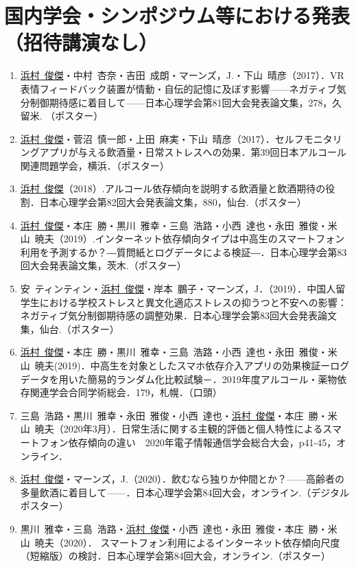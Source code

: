 \documentclass[11pt,a4paper]{article}
\begin{document}
\section{国内学会・シンポジウム等における発表（招待講演なし）}
\begin{enumerate}
	\item \underline{浜村\ 俊傑}・中村\ 杏奈・吉田\ 成朗・マーンズ，J.・下山\ 晴彦（2017）．VR表情フィードバック装置が情動・自伝的記憶に及ぼす影響——ネガティブ気分制御期待感に着目して——日本心理学会第81回大会発表論文集，278，久留米. （ポスター）
	\item \underline{浜村\ 俊傑}・菅沼\ 慎一郎・上田\ 麻実・下山\ 晴彦（2017）．セルフモニタリングアプリが与える飲酒量・日常ストレスへの効果．第39回日本アルコール関連問題学会，横浜．（ポスター）
	\item \underline{浜村\ 俊傑}（2018）.アルコール依存傾向を説明する飲酒量と飲酒期待の役割．日本心理学会第82回大会発表論文集，880，仙台.（ポスター）
	\item \underline{浜村\ 俊傑}・本庄\ 勝・黒川\ 雅幸・三島\ 浩路・小西\ 達也・永田\ 雅俊・米山\ 暁夫（2019）.インターネット依存傾向タイプは中高生のスマートフォン利用を予測するか？―質問紙とログデータによる検証―．日本心理学会第83回大会発表論文集，茨木.（ポスター）
	\item 安\ ティンティン・\underline{浜村\ 俊傑}・岸本\ 鵬子・マーンズ，J．（2019）．中国人留学生における学校ストレスと異文化適応ストレスの抑うつと不安への影響：ネガティブ気分制御期待感の調整効果．日本心理学会第83回大会発表論文集，仙台.（ポスター）
	\item\underline{浜村\ 俊傑}・本庄\ 勝・黒川\ 雅幸・三島\ 浩路・小西\ 達也・永田\ 雅俊・米山\ 暁夫(2019)．中高生を対象としたスマホ依存介入アプリの効果検証ーログデータを用いた簡易的ランダム化比較試験－．2019年度アルコール・薬物依存関連学会合同学術総会．179，札幌．（口頭）
	\item 三島\ 浩路・黒川\ 雅幸・永田\ 雅俊・小西\ 達也・\underline{浜村\ 俊傑}・本庄\ 勝・米山\ 暁夫（2020年3月）．日常生活に関する主観的評価と個人特性によるスマートフォン依存傾向の違い　2020年電子情報通信学会総合大会，p41-45，オンライン．　
	\item \underline{浜村\ 俊傑}・マーンズ，J.（2020）．飲むなら独りか仲間とか？——高齢者の多量飲酒に着目して——．日本心理学会第84回大会，オンライン.（デジタルポスター）
	\item 黒川\ 雅幸・三島\ 浩路・\underline{浜村\ 俊傑}・小西\ 達也・永田\ 雅俊・本庄\ 勝・米山\ 暁夫（2020）．	スマートフォン利用によるインターネット依存傾向尺度（短縮版）の検討．日本心理学会第84回大会，オンライン.（ポスター）

\end{enumerate}
\end{document}
